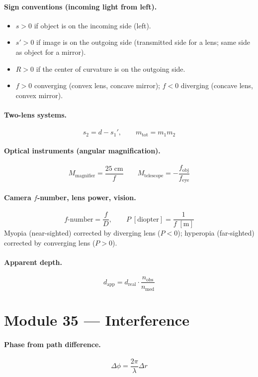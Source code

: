 \documentclass[11pt]{article}
\begin{document}
\paragraph{Sign conventions (incoming light from left).}
\begin{itemize}\itemsep0pt
  \item $s > 0$ if object is on the incoming side (left).
  \item $s' > 0$ if image is on the outgoing side (transmitted side for a lens; same side as object for a mirror).
  \item $R > 0$ if the center of curvature is on the outgoing side.
  \item $f > 0$ converging (convex lens, concave mirror); $f < 0$ diverging (concave lens, convex mirror).
\end{itemize}

\paragraph{Two-lens systems.}
\[
s_2 = d - s_1', \qquad m_{\text{tot}} = m_1 m_2
\]

\paragraph{Optical instruments (angular magnification).}
\[
M_{\text{magnifier}} = \frac{25\;\text{cm}}{f}
\qquad
M_{\text{telescope}} = -\frac{f_{\text{obj}}}{f_{\text{eye}}}
\]

\paragraph{Camera $f$-number, lens power, vision.}
\[
f\text{-number} = \frac{f}{D},
\qquad
P\;[\text{diopter}] = \frac{1}{f\;[\text{m}]}
\]
Myopia (near-sighted) corrected by diverging lens ($P<0$);
hyperopia (far-sighted) corrected by converging lens ($P>0$).

\paragraph{Apparent depth.}
\[
d_{\text{app}} = d_{\text{real}}\cdot\frac{n_{\text{obs}}}{n_{\text{med}}}
\]

\section*{Module 35 --- Interference}

\paragraph{Phase from path difference.}
\[
\Delta\phi = \frac{2\pi}{\lambda}\Delta r
\]
\end{document}
